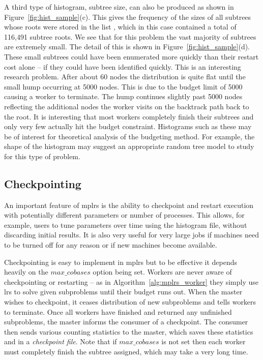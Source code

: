 \documentclass[a4paper,11pt]{article}   \usepackage{authblk} \usepackage[top=1.9cm,bottom=1.9cm,left=1.9cm,right=1.9cm]{geometry}
\newcommand{\progname}{\textsf}
\newcommand{\lrs}{\progname{lrs}\xspace}
\newcommand{\mplrs}{\progname{mplrs}\xspace}
\newcommand{\maxcobases}{\ensuremath{\mathit{max\_cobases}}\xspace}
\begin{document}
A third type of histogram, subtree size, can also be produced as shown
in Figure~\ref{fig:hist_sample}(c). 
This gives the frequency of the sizes of all subtrees whose roots were stored in
the list , which in this case contained a total of 116,491 subtree roots.
We see that for this problem the vast
majority of subtrees are extremely small. The detail of this is
shown in Figure~\ref{fig:hist_sample}(d). These small subtrees
could have been enumerated more quickly than their restart cost alone
 -- if they could have been identified quickly.
This is an interesting research problem.  After about 60 nodes the
distribution is quite flat until the small hump occurring at 5000 nodes.
This is due to the budget limit of 5000 causing a worker to terminate.
The hump continues slightly past 5000 nodes reflecting the additional
nodes the worker visits on the backtrack path back to the root.
It is interesting that most workers completely finish their
subtrees and only very few actually hit the budget constraint.
Histograms such as these may be of interest for
theoretical analysis of the budgeting method. For example, the shape of
the histogram may suggest an appropriate random tree model to study
for this type of problem.

\subsection{Checkpointing}
\label{subsec:checkp}

An important feature of \mplrs is the ability to
checkpoint and restart execution with potentially different
parameters or number of processes.  This allows, for example, users
to tune parameters over time using the histogram file, without discarding
initial results. It is also very useful for very large jobs
if machines need to be
turned off for any reason or if new machines become available.

Checkpointing is easy to implement in \mplrs but to be effective
it depends heavily on the \maxcobases option being set.  
Workers are never aware of
checkpointing or restarting -- as in Algorithm~\ref{alg:mplrs_worker} they 
simply use \lrs to solve given subproblems until their budget runs out.
When the master wishes to checkpoint, it ceases distribution of new subproblems
and tells workers to terminate.  Once all workers have finished and returned
any unfinished subproblems, the master informs the consumer of a checkpoint.
The consumer then sends various counting statistics to the master, which
saves these statistics and  in a \emph{checkpoint file}.
Note that if \maxcobases is not set then each worker must completely
finish the subtree assigned, which may take a very long time.
\end{document}
